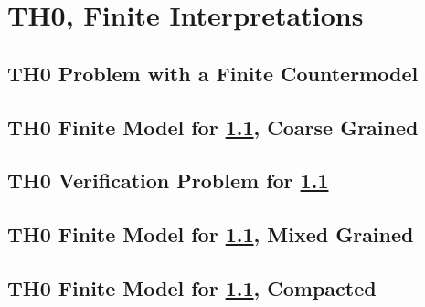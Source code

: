 \documentclass{easychair}
\begin{document}
\newpage
\section{TH0, Finite Interpretations}
\label{TH0Finite}

\subsection{TH0 Problem with a Finite Countermodel}
\label{THF_Finite.p}
\begin{small}

\end{small}

\newpage
\subsection{TH0 Finite Model for \ref{THF_Finite.p}, Coarse Grained}
\label{THF_Finite.s}
\begin{small}

\end{small}

\newpage
\subsection{TH0 Verification Problem for \ref{THF_Finite.p}}
\label{THF_Finite.s.p}
\begin{small}

\end{small}

\newpage
\subsection{TH0 Finite Model for \ref{THF_Finite.p}, Mixed Grained}
\label{THF_Finite_Medium.s}
\begin{small}

\end{small}

\newpage
\subsection{TH0 Finite Model for \ref{THF_Finite.p}, Compacted}
\label{THF_Finite_Compact.s}
\begin{small}

\end{small}

\newpage
\end{document}

